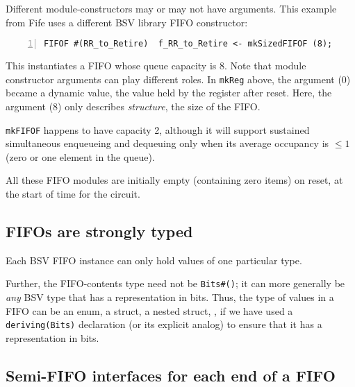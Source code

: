 Different module-constructors may or may not have arguments.  This
example from Fife uses a different BSV library FIFO constructor:


\begin{Verbatim}[frame=single, numbers=left]
   FIFOF #(RR_to_Retire)  f_RR_to_Retire <- mkSizedFIFOF (8);
\end{Verbatim}

This instantiates a FIFO whose queue capacity is 8.  Note that module
constructor arguments can play different roles.  In \verb|mkReg|
above, the argument (0) became a dynamic value, the value held by the
register after reset.  Here, the argument (8) only describes
\emph{structure}, {\ie} the size of the FIFO.

{\tt mkFIFOF} happens to have capacity 2, although it will support
sustained simultaneous enqueueing and dequeuing only when its average
occupancy is $\leq 1$ (zero or one element in the queue).

All these FIFO modules are initially empty (containing zero items) on
reset, {\ie} at the start of time for the circuit.


\subsection{FIFOs are strongly typed}


Each BSV FIFO instance can only hold values of one particular type.

Further, the FIFO-contents type need not be \verb|Bits#()|; it can
more generally be \emph{any} BSV type that has a representation in
bits.  Thus, the type of values in a FIFO can be an enum, a struct, a
nested struct, {\etc}, if we have used a \verb|deriving(Bits)|
declaration (or its explicit analog) to ensure that it has a
representation in bits.


\subsection{Semi-FIFO interfaces for each end of a FIFO}

